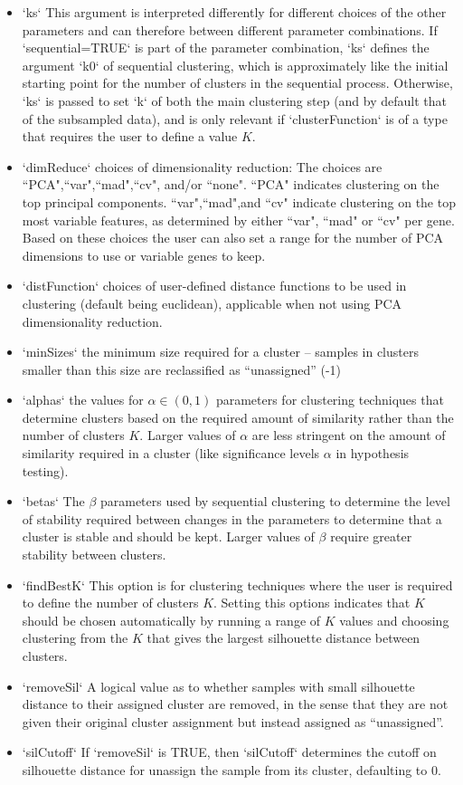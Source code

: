 \begin{itemize}
\item `ks` This argument is interpreted differently for different choices of the other parameters and can therefore between different parameter combinations. If `sequential=TRUE` is part of the parameter combination, `ks` defines the argument `k0` of sequential clustering, which is approximately like the initial starting point for the number of clusters in the sequential process.  Otherwise, `ks` is passed to set `k` of both the main clustering step (and by default that of the subsampled data), and is only relevant if `clusterFunction` is of a type that requires the user to define a value $K$.
\item `dimReduce` choices of dimensionality reduction: The choices are ``PCA",``var",``mad",``cv", and/or ``none". ``PCA" indicates clustering on the top principal components. ``var",``mad",and ``cv" indicate clustering on the top most variable features, as determined by either ``var", ``mad" or ``cv" per gene. Based on these choices the user can also set a range for the number of PCA dimensions to use or variable genes to keep.
\item `distFunction` choices of user-defined distance functions to be used in clustering (default being euclidean), applicable when not using PCA dimensionality reduction.
\item `minSizes` the minimum size required for a cluster -- samples in clusters smaller than this size are reclassified as ``unassigned'' (-1)
\item `alphas` the values for $\alpha\in (0,1)$ parameters for clustering techniques that determine clusters based on the required amount of similarity rather than the number of clusters $K$. Larger values of $\alpha$ are less stringent on the amount of similarity required in a cluster (like significance levels $\alpha$ in hypothesis testing).
\item `betas` The $\beta$ parameters used by sequential clustering to determine the level of stability required between changes in the parameters to determine that a cluster is stable and should be kept. Larger values of $\beta$ require greater stability between clusters.
\item `findBestK` This option is for clustering techniques where the user is required to define the number of clusters $K$. Setting this options indicates that $K$ should be chosen automatically by running a range of $K$ values and choosing clustering from the $K$ that gives the largest silhouette distance between clusters.
\item `removeSil` A logical value as to whether samples with small silhouette distance to their assigned cluster are removed, in the sense that they are not given their original cluster assignment but instead assigned as ``unassigned''. 
  \item `silCutoff` If `removeSil` is TRUE, then `silCutoff` determines the cutoff on silhouette distance for unassign the sample from its cluster, defaulting to 0. 
\end{itemize}


